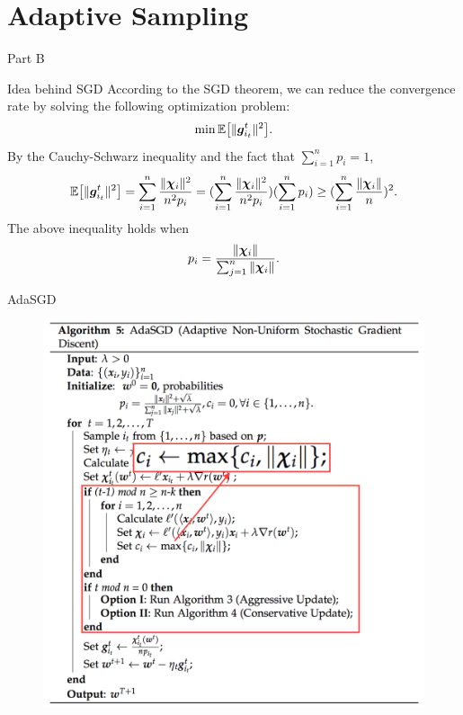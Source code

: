 \section{Adaptive Sampling}
\begin{frame}{Part B}
\Large \center{\color{blue}{Adaptive Sampling Algorithms}}
\end{frame}

\begin{frame}{Idea behind SGD}
According to the SGD theorem, we can reduce the convergence rate by solving the following optimization problem:
\[
    \min \mathbb{E}\big[\|\bm{g}_{i_t}^t\|^2\big].
\]
By the Cauchy-Schwarz inequality and the fact that $\sum_{i=1}^n p_i = 1$,
\[ 
    \mathbb{E}\big[\|\bm{g}_{i_t}^t\|^2\big] = \sum_{i=1}^n \frac{\|\bm{\chi}_i\|^2}{n^2p_i} = (\sum_{i=1}^n \frac{\|\bm{\chi}_i\|^2}{n^2p_i}) (\sum_{i=1}^n p_i) \ge (\sum_{i=1}^n \frac{\|\bm{\chi}_i\|}{n})^2.
\]
The above inequality holds when 
\begin{equation*}\label{eq:p_optimal}
    p_i = \frac{\|\bm{\chi}_i\|}{\sum_{j=1}^n \|\bm{\chi}_i\|}.
\end{equation*}

\end{frame}

\begin{frame}{AdaSGD}
\begin{figure}[H]
        \includegraphics[height=0.8\textheight]{images/AdaSGD.png} 
    \label{fig:AdaSGD}
\end{figure}
\end{frame}

